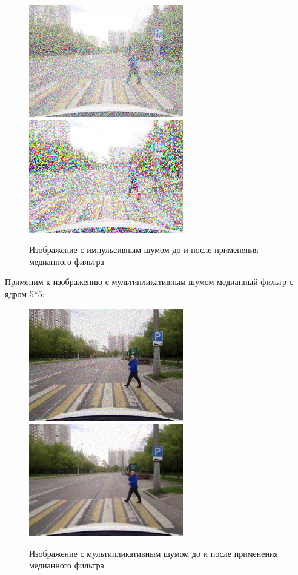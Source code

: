 \begin{figure}[hbt!]
    \centering
    \includegraphics[width=0.6\textwidth]{../outputs/image_impulse_noise.png}
    \includegraphics[width=0.6\textwidth]{../addition/image_impulse_median_filter_k5.png}
    \caption{Изображение с импульсивным шумом до и после применения медианного фильтра}
    \label{fig:stich_images}
\end{figure}

\pagebreak
Применим к изображению с мультипликативным шумом медианный фильтр с ядром 5*5:

\begin{figure}[hbt!]
    \centering
    \includegraphics[width=0.6\textwidth]{../outputs/image_mltp_noise.png}
    \includegraphics[width=0.6\textwidth]{../addition/image_mltp_median_filter_k5.png}
    \caption{Изображение с мультипликативным шумом до и после применения медианного фильтра}
    \label{fig:stich_images}
\end{figure}

